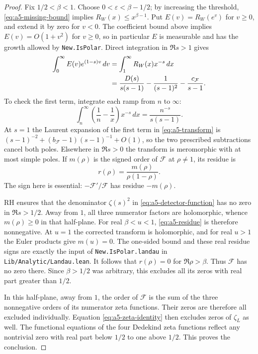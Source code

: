\begin{proof}
Fix $1/2<\beta<1$.  Choose $0<\varepsilon<\beta-1/2$; by increasing the
threshold, \eqref{eq:a5-missing-bound} implies
$R_W(x)\leq x^{\beta-1}$.  Put $E(v)=R_W(e^v)$ for $v\geq0$, and extend it
by zero for $v<0$.  The coefficient bound above
implies $E(v)=O(1+v^2)$ for $v\geq0$, so in particular $E$ is measurable and
has the growth allowed by \texttt{New.IsPolar}.  Direct integration in
$\Re s>1$ gives
\begin{align}
 \int_0^\infty E(v)e^{(1-s)v}\,dv
 &=\int_1^\infty R_W(x)x^{-s}\,dx\notag\\
 &=\frac{D(s)}{s(s-1)}-\frac1{(s-1)^2}
                         -\frac{c_{\mathcal F}}{s-1}.
 \label{eq:a5-transform}
\end{align}
To check the first term, integrate each ramp from $n$ to $\infty$:
\[
 \int_n^\infty\left(\frac1n-\frac1x\right)x^{-s}\,dx
 =\frac{n^{-s}}{s(s-1)}.
\]
At $s=1$ the Laurent expansion of the first term in
\eqref{eq:a5-transform} is
$(s-1)^{-2}+(b_{\mathcal F}-1)(s-1)^{-1}+O(1)$, so the two prescribed
subtractions cancel both poles.  Elsewhere in $\Re s>0$ the transform is
meromorphic with at most simple poles.  If $m(\rho)$ is the signed order of
$\mathcal F$ at $\rho\ne1$, its residue is
\begin{equation}
 r(\rho)=\frac{m(\rho)}{\rho(1-\rho)}.
 \label{eq:a5-residue}
\end{equation}
The sign here is essential: $-\mathcal F'/\mathcal F$ has residue $-m(\rho)$.

RH ensures that the denominator $\zeta(s)^2$ in
\eqref{eq:a5-detector-function} has no zero in $\Re s>1/2$.  Away from $1$,
all three numerator factors are holomorphic, whence $m(\rho)\geq0$ in that
half-plane.  For real $\beta<u<1$, \eqref{eq:a5-residue} is therefore
nonnegative.  At $u=1$ the corrected transform is holomorphic, and for real
$u>1$ the Euler products give $m(u)=0$.  The one-sided bound and these real
residue signs are exactly the input of
\texttt{New.IsPolar.landau} in \texttt{Lib/Analytic/Landau.lean}.
It follows that $r(\rho)=0$ for $\Re\rho>\beta$.  Thus $\mathcal F$ has no
zero there.  Since $\beta>1/2$ was arbitrary, this excludes all its zeros
with real part greater than $1/2$.

In this half-plane, away from $1$, the order of $\mathcal F$ is the sum of
the three nonnegative orders of its numerator zeta functions.  Their zeros
are therefore all excluded individually.  Equation
\eqref{eq:a5-zeta-identity} then excludes zeros of $\zeta_L$ as well.
The functional equations of the four Dedekind zeta functions reflect any
nontrivial zero with real part below $1/2$ to one above $1/2$.  This proves
the conclusion.
\end{proof}

